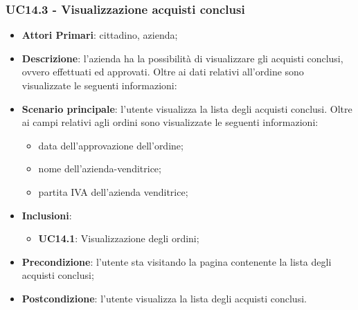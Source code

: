 \subsubsection{UC14.3 - Visualizzazione acquisti conclusi}
\begin{itemize}
	\item \textbf{Attori Primari}: cittadino, azienda;
	\item \textbf{Descrizione}: l'azienda ha la possibilità di visualizzare gli acquisti conclusi, ovvero effettuati ed approvati. Oltre ai dati relativi all'ordine sono visualizzate le seguenti informazioni:
	\item \textbf{Scenario principale}: l'utente visualizza la lista degli acquisti conclusi. Oltre ai campi relativi agli ordini sono visualizzate le seguenti informazioni:
	\begin{itemize}
		\item data dell'approvazione dell'ordine;
		\item nome dell'azienda-venditrice;
		\item partita IVA dell'azienda venditrice;
	\end{itemize}
	
	\item \textbf{Inclusioni}:
	\begin{itemize}
		\item \textbf{UC14.1}: Visualizzazione degli ordini;
	\end{itemize}
	\item \textbf{Precondizione}: l'utente sta visitando la pagina contenente la lista degli acquisti conclusi;
	\item \textbf{Postcondizione}: l'utente visualizza la lista degli acquisti conclusi.
\end{itemize}

